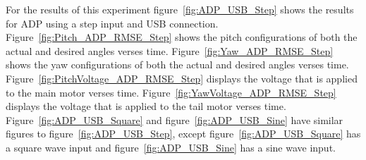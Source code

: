 For the results of this experiment figure~\ref{fig:ADP_USB_Step} shows the results for ADP using a step input and USB connection.  Figure~\ref{fig:Pitch_ADP_RMSE_Step} shows the pitch configurations of both the actual and desired angles verses time.  Figure~\ref{fig:Yaw_ADP_RMSE_Step} shows the yaw configurations of both the actual and desired angles verses time.  Figure~\ref{fig:PitchVoltage_ADP_RMSE_Step} displays the voltage that is applied to the main motor verses time.  Figure~\ref{fig:YawVoltage_ADP_RMSE_Step} displays the voltage that is applied to the tail motor verses time.  Figure~\ref{fig:ADP_USB_Square} and figure~\ref{fig:ADP_USB_Sine} have similar figures to figure~\ref{fig:ADP_USB_Step}, except figure~\ref{fig:ADP_USB_Square} has a square wave input and figure~\ref{fig:ADP_USB_Sine} has a sine wave input.
\begin{figure}[!htbp]
    \centering
\end{figure}
